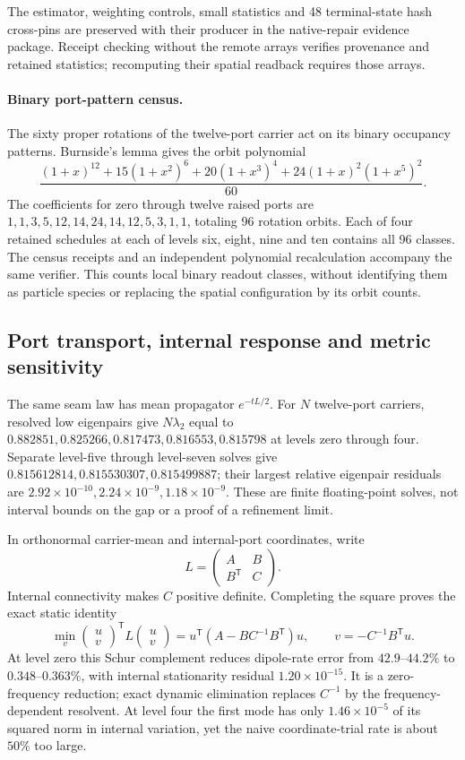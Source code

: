 The estimator, weighting controls, small statistics and 48 terminal-state
hash cross-pins are preserved with their producer in the native-repair
evidence package. Receipt checking without the remote arrays verifies
provenance and retained statistics; recomputing their spatial readback
requires those arrays.

\paragraph{Binary port-pattern census.}
The sixty proper rotations of the twelve-port carrier act on its binary
occupancy patterns. Burnside's lemma gives the orbit polynomial
\[
 \frac{(1+x)^{12}+15(1+x^2)^6+20(1+x^3)^4
       +24(1+x)^2(1+x^5)^2}{60}.
\]
The coefficients for zero through twelve raised ports are
$1,1,3,5,12,14,24,14,12,5,3,1,1$, totaling 96 rotation orbits.
Each of four retained schedules at each of levels six, eight, nine and ten
contains all 96 classes. The census receipts and an independent polynomial
recalculation accompany the same verifier. This counts local binary
readout classes, without identifying them as particle species or replacing
the spatial configuration by its orbit counts.

\subsection{Port transport, internal response and metric sensitivity}
\label{subsec:native-transport-evidence}
The same seam law has mean propagator \(e^{-tL/2}\). For \(N\)
twelve-port carriers, resolved low eigenpairs give \(N\lambda_2\) equal
to \(0.882851,0.825266,0.817473,0.816553,0.815798\) at levels zero
through four. Separate level-five through level-seven solves give
\(0.815612814,0.815530307,0.815499887\); their largest relative
eigenpair residuals are \(2.92\times10^{-10},2.24\times10^{-9},
1.18\times10^{-9}\). These are finite floating-point solves, not
interval bounds on the gap or a proof of a refinement limit.

In orthonormal carrier-mean and internal-port coordinates, write
\[
 L=\begin{pmatrix}A&B\\ B^{\mathsf T}&C\end{pmatrix}.
\]
Internal connectivity makes \(C\) positive definite. Completing the
square proves the exact static identity
\[
 \min_v\begin{pmatrix}u\\v\end{pmatrix}^{\mathsf T}
 L\begin{pmatrix}u\\v\end{pmatrix}
 =u^{\mathsf T}(A-BC^{-1}B^{\mathsf T})u,
 \qquad v=-C^{-1}B^{\mathsf T}u.
\]
At level zero this Schur complement reduces dipole-rate error from
\(42.9\)--\(44.2\%\) to \(0.348\)--\(0.363\%\), with internal
stationarity residual \(1.20\times10^{-15}\). It is a zero-frequency
reduction; exact dynamic elimination replaces \(C^{-1}\) by the
frequency-dependent resolvent. At level four the first mode has only
\(1.46\times10^{-5}\) of its squared norm in internal variation,
yet the naive coordinate-trial rate is about \(50\%\) too large.

